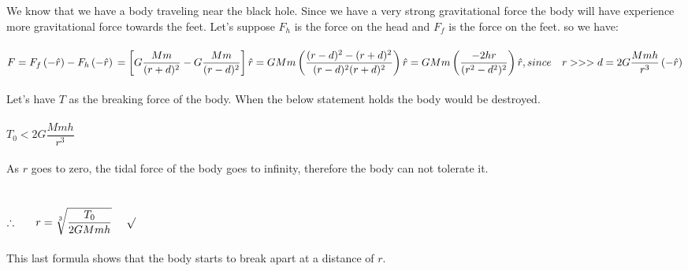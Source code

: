 \documentclass[fleqn]{article}
\begin{document}
\begin{enumerate}
      \textcolor{hwColor}{
        \\
        \\
        We know that we have a body traveling near the black hole. Since we have a very strong gravitational force the
        body will have experience more gravitational force towards the feet. Let's suppose $F_h$ is the force on the head 
        and $F_f$ is the force on the feet. so we have: \\
        \\ 
        $
          F=F_f \left(-\hat{r}\right)-F_h \left(-\hat{r}\right)
          \\
          \\
          \\
          =\left[G\dfrac{Mm}{(r+d)^2}-G\dfrac{Mm}{(r-d)^2}\right] \hat{r}
          \\
          \\
          \\
          =GMm \left(\dfrac{(r-d)^2-(r+d)^2}{(r-d)^2(r+d)^2}\right) \hat{r}
          \\
          \\
          \\
          =GMm \left(\dfrac{-2hr}{(r^2-d^2)^2}\right) \hat{r}, since ~~~ r>>>d
          \\
          \\
          \\
          =2G\dfrac{Mmh}{r^3} \left(-\hat{r}\right) 
        $ 
        \\
        \\
        Let's have $T$ as the breaking force of the body. When the below statement holds the body
        would be destroyed.
        \\
        \\
        $
          T_0< 2G\dfrac{Mmh}{r^3}
        $
        \\
        \\
        As $r$ goes to zero, the tidal force of the body goes to infinity, therefore the body can not tolerate it.
        \\
        \\
        \\
        $
          \therefore ~~~~~ r=\sqrt[3]{\dfrac{T_0}{2GMmh}} ~~~~ \surd
        $
        \\
        \\
        This last formula shows that the body starts to break apart at a distance of $r$.
      }


\end{enumerate}
\end{document}
